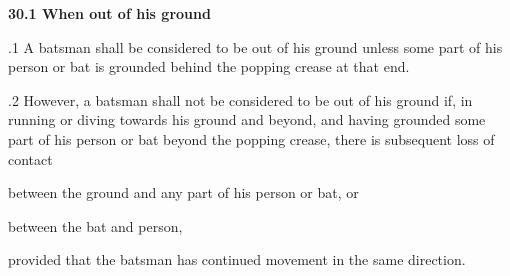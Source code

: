 \documentclass[12pt]{article}
\begin{document}
\vspace{\baselineskip}
{\fontsize{11pt}{13.2pt}\selectfont \textbf{30.1 \tabto{0.47in} When out of his ground}\par}\par


\vspace{\baselineskip}
\begin{adjustwidth}{0.5in}{0.24in}
{\fontsize{9pt}{10.8pt}.1 \tabto{0.49in} A batsman shall be considered to be out of his ground unless some part of his person or bat is grounded behind the popping crease at that end.\par}\par

\end{adjustwidth}


\vspace{\baselineskip}
\begin{adjustwidth}{0.5in}{0.08in}
{\fontsize{9pt}{10.8pt}.2 \tabto{0.49in} However, a batsman shall not be considered to be out of his ground if, in running or diving towards his ground and beyond, and having grounded some part of his person or bat beyond the popping crease, there is subsequent loss of contact\par}\par

\end{adjustwidth}


\vspace{\baselineskip}
\begin{adjustwidth}{0.5in}{0.0in}
{\fontsize{9pt}{10.8pt}\selectfont between the ground and any part of his person or bat, or\par}\par

\end{adjustwidth}


\vspace{\baselineskip}
\begin{adjustwidth}{0.5in}{0.0in}
{\fontsize{9pt}{10.8pt}\selectfont between the bat and person,\par}\par

\end{adjustwidth}


\vspace{\baselineskip}
\begin{adjustwidth}{0.5in}{0.0in}
{\fontsize{9pt}{10.8pt}\selectfont provided that the batsman has continued movement in the same direction.\par}\par

\end{adjustwidth}
\end{document}
